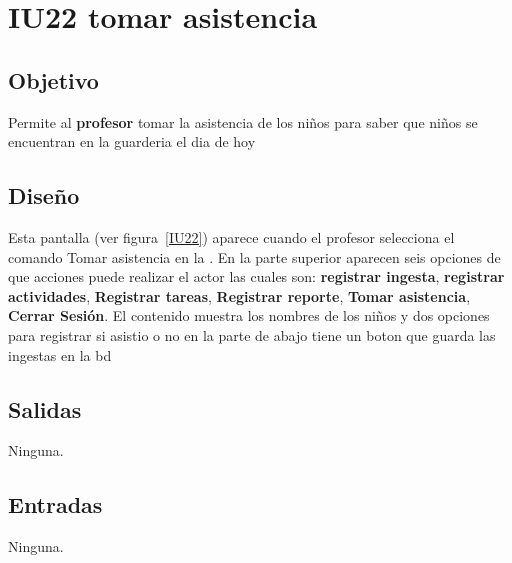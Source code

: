 \newpage
\section{IU22 tomar asistencia}

\subsection{Objetivo}
	Permite al {\bf profesor} tomar la asistencia de los niños para saber que niños se encuentran en la guarderia el dia de hoy

\subsection{Diseño}
	   Esta pantalla  (ver figura~\ref{IU22}) aparece cuando el            profesor selecciona el comando Tomar asistencia en la . 
         En la parte superior aparecen seis opciones de que acciones puede realizar el actor las cuales son: {\bf registrar ingesta}, {\bf registrar actividades}, {\bf Registrar tareas}, {\bf Registrar reporte}, {\bf Tomar asistencia}, {\bf Cerrar Sesión}. 
         El contenido muestra los nombres de los niños y dos opciones para registrar si asistio o no
         en la parte de abajo tiene un boton que guarda las ingestas en la bd
         
 

\subsection{Salidas}

	Ninguna.

\subsection{Entradas}
        Ninguna.

